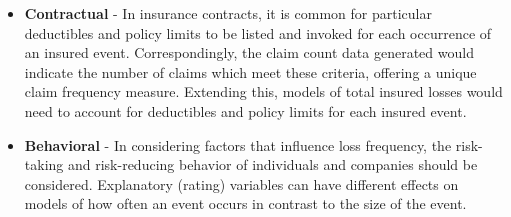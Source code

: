\documentclass[]{book}
\providecommand{\tightlist}{%
  \setlength{\itemsep}{0pt}\setlength{\parskip}{0pt}}
\theoremstyle{definition}
\theoremstyle{definition}
\theoremstyle{definition}
\theoremstyle{remark}
\begin{document}
\begin{itemize}
\tightlist
\item
  \textbf{Contractual} - In insurance contracts, it is common for
  particular deductibles and policy limits to be listed and invoked for
  each occurrence of an insured event. Correspondingly, the claim count
  data generated would indicate the number of claims which meet these
  criteria, offering a unique claim frequency measure. Extending this,
  models of total insured losses would need to account for deductibles
  and policy limits for each insured event.
\item
  \textbf{Behavioral} - In considering factors that influence loss
  frequency, the risk-taking and risk-reducing behavior of individuals
  and companies should be considered. Explanatory (rating) variables can
  have different effects on models of how often an event occurs in
  contrast to the size of the event.


\end{itemize}
\end{document}
